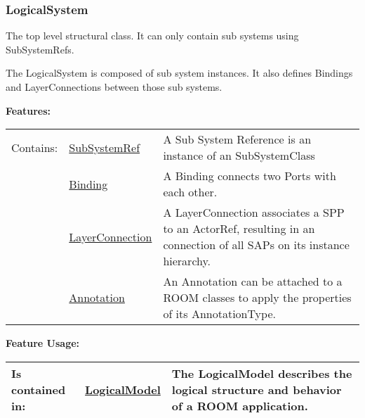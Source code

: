 	
	\vspace{\baselineskip}
	\vspace{\baselineskip}
	\vspace{\baselineskip}
	
\subsubsection{LogicalSystem}
	\hypertarget{ref:LogicalSystem}{}
	The top level structural class. It can only contain sub systems using SubSystemRefs.
		
	The LogicalSystem is composed of sub system instances. It also defines Bindings and LayerConnections between those sub systems. 
		
		
	\begingroup
	\textbf{Features:}
	\renewcommand{\arraystretch}{1.8} %
	\begin{longtable}{l|l p{}}
		\hline
	Contains: & \tabitem \hyperlink{ref:SubSystemRef}{SubSystemRef}  & A Sub System Reference is an instance of an SubSystemClass\\
	& \tabitem \hyperlink{ref:Binding}{Binding}  & A Binding connects two Ports with each other. \\
	& \tabitem \hyperlink{ref:LayerConnection}{LayerConnection}  & A LayerConnection associates a SPP to an ActorRef, resulting in an connection of all SAPs on its instance hierarchy. \\
	& \tabitem \hyperlink{ref:Annotation}{Annotation}  & An Annotation can be attached to a ROOM classes to apply the properties of its AnnotationType. \\
	\hline
	\end{longtable}
	\endgroup
		
	\begingroup
	\textbf{Feature Usage:}
	\renewcommand{\arraystretch}{1.8} %
	\begin{longtable}{l|l p{}}
		\hline
	Is contained in: & \tabitem \hyperlink{ref:LogicalModel}{LogicalModel}  & The LogicalModel describes the logical structure and behavior of a ROOM application.\\
	\hline
	\end{longtable}
	\endgroup
		
	
	\vspace{\baselineskip}
	\vspace{\baselineskip}
	\vspace{\baselineskip}
	
